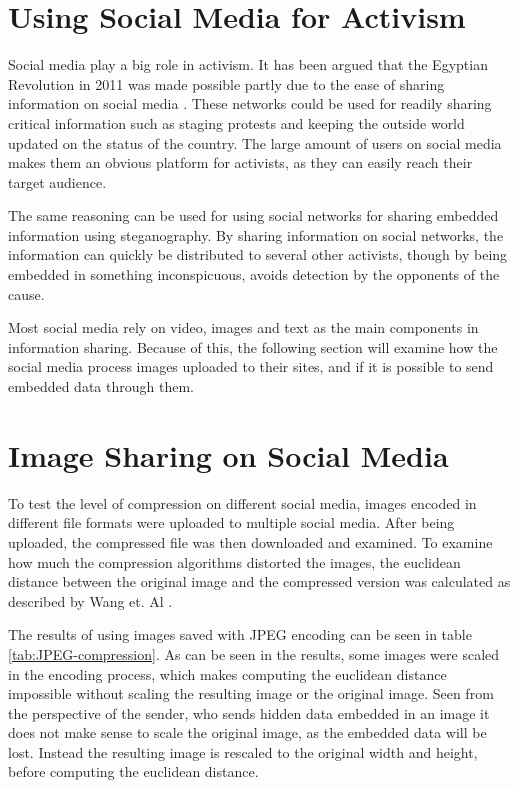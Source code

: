 \clearpage
\section{Using Social Media for Activism}
Social media play a big role in activism.
It has been argued that the Egyptian Revolution in 2011 was made possible partly due to the ease of sharing information on social media \citep{IJoC1242}. 
These networks could be used for readily sharing critical information such as staging protests and keeping the outside world updated on the status of the country.
The large amount of users on social media makes them an obvious platform for activists, as they can easily reach their target audience. 

The same reasoning can be used for using social networks for sharing embedded information using steganography. 
By sharing information on social networks, the information can quickly be distributed to several other activists, though by being embedded in something inconspicuous, avoids detection by the opponents of the cause.

Most social media rely on video, images and text as the main components in information sharing.
Because of this, the following section will examine how the social media process images uploaded to their sites, and if it is possible to send embedded data through them.

\section{Image Sharing on Social Media}
To test the level of compression on different social media, images encoded in different file formats were uploaded to multiple social media. 
After being uploaded, the compressed file was then downloaded and examined.
To examine how much the compression algorithms distorted the images, the euclidean distance between the original image and the compressed version was calculated as described by Wang et. Al \citep{Wang2005}.

The results of using images saved with JPEG encoding can be seen in table \ref{tab:JPEG-compression}. 
As can be seen in the results, some images were scaled in the encoding process, which makes computing the euclidean distance impossible without scaling the resulting image or the original image. Seen from the perspective of the sender, who sends hidden data embedded in an image it does not make sense to scale the original image, as the embedded data will be lost. Instead the resulting image is rescaled to the original width and height, before computing the euclidean distance.

